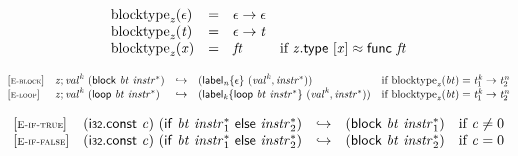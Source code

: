 \vspace{1ex}

$$
\begin{array}{@{}lcl@{}l@{}}
{{\mathrm{blocktype}}}_{{\mathit{z}}}(\epsilon) &=& \epsilon \rightarrow \epsilon &  \\
{{\mathrm{blocktype}}}_{{\mathit{z}}}({\mathit{t}}) &=& \epsilon \rightarrow {\mathit{t}} &  \\
{{\mathrm{blocktype}}}_{{\mathit{z}}}({\mathit{x}}) &=& {\mathit{ft}} &\quad
  \mbox{if}~{\mathit{z}}.\mathsf{type}~{}[{\mathit{x}}] \approx \mathsf{func}~{\mathit{ft}} \\
\end{array}
$$

$$
\begin{array}{@{}l@{}lcl@{}l@{}}
{[\textsc{\scriptsize E{-}block}]} \quad & {\mathit{z}} ; {{\mathit{val}}^{{\mathit{k}}}}~(\mathsf{block}~{\mathit{bt}}~{{\mathit{instr}}^\ast}) &\hookrightarrow& ({{\mathsf{label}}_{{\mathit{n}}}}{\{\epsilon\}}~({{\mathit{val}}^{{\mathit{k}}}}, {{\mathit{instr}}^\ast})) &\quad
  \mbox{if}~{{\mathrm{blocktype}}}_{{\mathit{z}}}({\mathit{bt}}) = {{\mathit{t}}_{{1}}^{{\mathit{k}}}} \rightarrow {{\mathit{t}}_{{2}}^{{\mathit{n}}}} \\
{[\textsc{\scriptsize E{-}loop}]} \quad & {\mathit{z}} ; {{\mathit{val}}^{{\mathit{k}}}}~(\mathsf{loop}~{\mathit{bt}}~{{\mathit{instr}}^\ast}) &\hookrightarrow& ({{\mathsf{label}}_{{\mathit{k}}}}{\{\mathsf{loop}~{\mathit{bt}}~{{\mathit{instr}}^\ast}\}}~({{\mathit{val}}^{{\mathit{k}}}}, {{\mathit{instr}}^\ast})) &\quad
  \mbox{if}~{{\mathrm{blocktype}}}_{{\mathit{z}}}({\mathit{bt}}) = {{\mathit{t}}_{{1}}^{{\mathit{k}}}} \rightarrow {{\mathit{t}}_{{2}}^{{\mathit{n}}}} \\
\end{array}
$$

$$
\begin{array}{@{}l@{}lcl@{}l@{}}
{[\textsc{\scriptsize E{-}if{-}true}]} \quad & (\mathsf{i{\scriptstyle32}}.\mathsf{const}~{\mathit{c}})~(\mathsf{if}~{\mathit{bt}}~{{\mathit{instr}}_{{1}}^\ast}~\mathsf{else}~{{\mathit{instr}}_{{2}}^\ast}) &\hookrightarrow& (\mathsf{block}~{\mathit{bt}}~{{\mathit{instr}}_{{1}}^\ast}) &\quad
  \mbox{if}~{\mathit{c}} \neq 0 \\
{[\textsc{\scriptsize E{-}if{-}false}]} \quad & (\mathsf{i{\scriptstyle32}}.\mathsf{const}~{\mathit{c}})~(\mathsf{if}~{\mathit{bt}}~{{\mathit{instr}}_{{1}}^\ast}~\mathsf{else}~{{\mathit{instr}}_{{2}}^\ast}) &\hookrightarrow& (\mathsf{block}~{\mathit{bt}}~{{\mathit{instr}}_{{2}}^\ast}) &\quad
  \mbox{if}~{\mathit{c}} = 0 \\
\end{array}
$$

